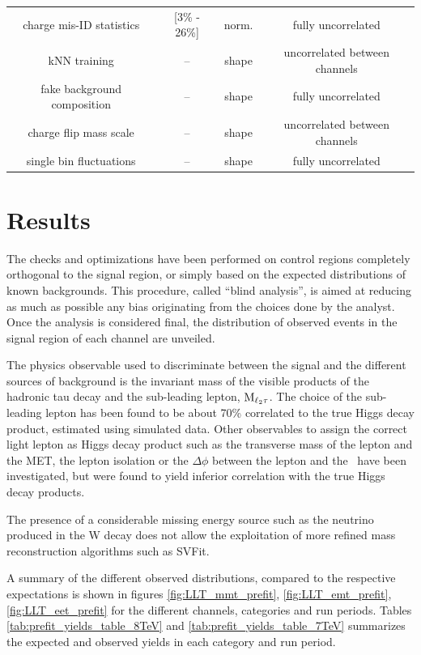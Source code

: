 \begin{table}
\begin{center}
\begin{tabular}{c c c c}
      charge mis-ID statistics & [3\% - 26\%] & norm. & fully uncorrelated \\
      kNN training & -- & shape & uncorrelated between channels \\
      fake background composition & -- & shape & fully uncorrelated \\
      charge flip mass scale & -- & shape & uncorrelated between channels \\
      single bin fluctuations & -- & shape & fully uncorrelated \\
      \hline
    \end{tabular}
  \end{center}
\end{table}

\section{Results}

The checks and optimizations have been performed on control regions completely orthogonal to the signal region, or simply based on the expected distributions of known backgrounds. This procedure, called ``blind analysis'', is aimed at reducing as much as possible any bias originating from the choices done by the analyst. 
Once the analysis is considered final, the distribution of observed events in the signal region of each channel are unveiled. 

The physics observable used to discriminate between the signal and the different sources of background is the invariant mass of the visible products of the hadronic tau decay and the sub-leading lepton, $\rm{M}_{\ell_2 \tau}$. The choice of the sub-leading lepton has been found to be about 70\% correlated to the true Higgs decay product, estimated using simulated data. Other observables to assign the correct light lepton as Higgs decay product such as the transverse mass of the lepton and the MET, the lepton isolation or the $\Delta\phi$ between the lepton and the \MET\ have been investigated, but were found to yield inferior correlation with the true Higgs decay products.

The presence of a considerable missing energy source such as the neutrino produced in the W decay does not allow the exploitation of more refined mass reconstruction algorithms such as SVFit.

A summary of the different observed distributions, compared to the respective expectations is shown in figures \ref{fig:LLT_mmt_prefit}, \ref{fig:LLT_emt_prefit}, \ref{fig:LLT_eet_prefit} for the different channels, categories and run periods. Tables \ref{tab:prefit_yields_table_8TeV} and \ref{tab:prefit_yields_table_7TeV} summarizes the expected and observed yields in each category and run period.

